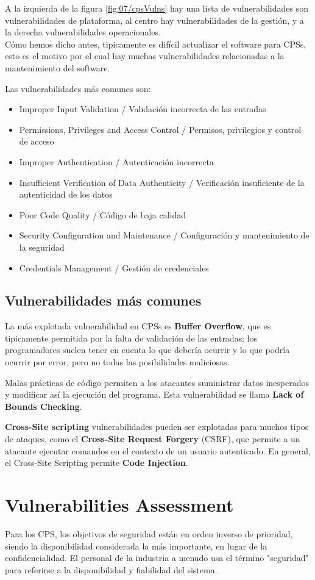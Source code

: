 A la izquierda de la figura \ref{fig:07/cpsVulns} hay una lista de vulnerabilidades son vulnerabilidades de plataforma, al centro hay vulnerabilidades de la gestión, y a la derecha vulnerabilidades operacionales.\\
Cómo hemos dicho antes, tipicamente es difícil actualizar el software para CPSs, esto es el motivo por el cual hay muchas vulnerabilidades relacionadas a la mantenimiento del software.

Las vulnerabilidades más comunes son:
\begin{itemize}
	\item Improper Input Validation / Validación incorrecta de las entradas
	\item Permissions, Privileges and Access Control / Permisos, privilegios y control de acceso
	\item Improper Authentication / Autenticación incorrecta
	\item Insufficient Verification of Data Authenticity / Verificación insuficiente de la autenticidad de los datos
	\item Poor Code Quality / Código de baja calidad
	\item Security Configuration and Maintenance / Configuración y mantenimiento de la seguridad
	\item Credentials Management / Gestión de credenciales
\end{itemize}

\subsection{Vulnerabilidades más comunes}
La más explotada vulnerabilidad en CPSs es \textbf{Buffer Overflow}, que es tipicamente permitida por la falta de validación de las entradas: los programadores suelen tener en cuenta lo que debería ocurrir y lo que podría ocurrir por error, pero no todas las posibilidades maliciosas.

Malas prácticas de código permiten a los atacantes suministrar datos inesperados y modificar así la ejecución del programa. Esta vulnerabilidad se llama \textbf{Lack of Bounds Checking}.


\textbf{Cross-Site scripting} vulnerabilidades pueden ser explotadas para muchos tipos de ataques, como el \textbf{Cross-Site Request Forgery} (CSRF), que permite a un atacante ejecutar comandos en el contexto de un usuario autenticado. En general, el Cross-Site Scripting permite \textbf{Code Injection}. 

\section{Vulnerabilities Assessment}
Para los CPS, los objetivos de seguridad están en orden inverso de prioridad, siendo la disponibilidad considerada la más importante, en lugar de la confidencialidad. El personal de la industria a menudo usa el término "seguridad" para referirse a la disponibilidad y fiabilidad del sistema.

